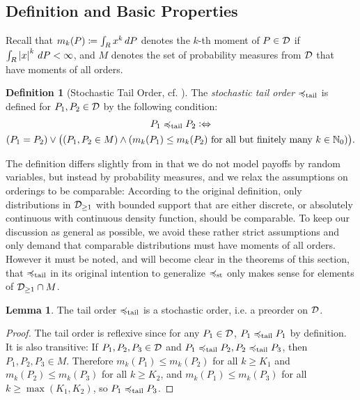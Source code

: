 \documentclass[a4paper,DIV=11]{scrreprt}
\newcommand{\M}{M}
\theoremstyle{definition}
\newtheorem{lemma}[thm]{Lemma} %
\newtheorem{defn}[thm]{Definition} %
\begin{document}
    \subsection{Definition and Basic Properties}
    \label{subsec:tailOrderDefinitionAndBasicProperties}
    Recall that $m_k(P) \coloneqq \int_{R} x^k \, dP$ denotes the $k$-th moment of $P \in \mathcal{D}$ if $\int_{R} \left| x \right|^k \, dP < \infty$, and $M$ denotes the set of probability measures from $\mathcal{D}$ that have moments of all orders.
    \begin{defn}[{Stochastic Tail Order, cf. \cite[Definition 2]{bib:rassTotalOrderingOnLossDistributions}}]
        \label{def:stochasticTailOrder}
        The \emph{stochastic tail order} $\preccurlyeq_{\text{tail}}$ is defined for $P_1, P_2 \in \mathcal{D}$ by the following condition:
        \begin{multline*}
            P_1 \leqtail P_2 \colonlra \\
            (P_1 = P_2) \vee \bigpars{(P_1, P_2 \in \M) \wedge (m_k(P_1) \leq m_k(P_2) \text{ for all but finitely many $k \in \N_0$})}.
        \end{multline*}
    \end{defn}
    The definition differs slightly from \cite[Definition 2]{bib:rassTotalOrderingOnLossDistributions} in that we do not model payoffs by random variables, but instead by probability measures, and we relax the assumptions on orderings to be comparable:
    According to the original definition, only distributions in $\mathcal{D}_{\geq1}$ with bounded support that are either discrete, or absolutely continuous with continuous density function, should be comparable. To keep our discussion as general as possible, we avoid these rather strict assumptions and only demand that comparable distributions must have moments of all orders.
    However it must be noted, and will become clear in the theorems of this section, that $\preccurlyeq_{\text{tail}}$ in its original intention to generalize $\preccurlyeq_{\text{st}}$ only makes sense for elements of $\mathcal{D}_{\geq1} \cap M$.

    \begin{lemma}
        The tail order $\preccurlyeq_{\text{tail}}$ is a stochastic order, i.e. a preorder on $\mathcal{D}$.
    \end{lemma}
    \begin{proof}
        The tail order is reflexive since for any $P_1 \in \mathcal{D}$, $P_1 \preccurlyeq_{\text{tail}} P_1$ by definition.
        It is also transitive: If $P_1, P_2, P_3 \in \mathcal{D}$ and $P_1 \preccurlyeq_{\text{tail}} P_2, P_2 \preccurlyeq_{\text{tail}} P_3$, then $P_1, P_2, P_3 \in M$.        
        Therefore $m_k(P_1) \leq m_k(P_2)$ for all $k \geq K_1$ and $m_k(P_2) \leq m_k(P_3)$ for all $k \geq K_2$, and $m_k(P_1) \leq m_k(P_3)$ for all $k \geq \max(K_1, K_2)$, so $P_1 \preccurlyeq_{\text{tail}} P_3$.
    \end{proof}
    
\end{document}
